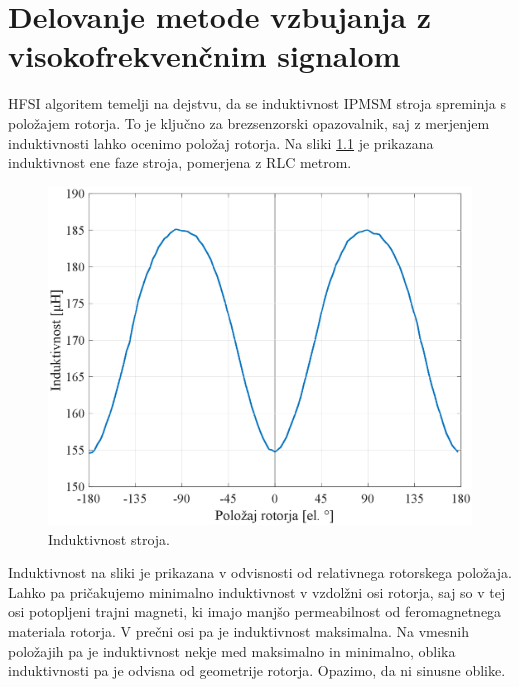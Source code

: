 \documentclass[a4paper,twoside,openright,12pt,slovene]{book}
\begin{document}

\chapter{Delovanje metode vzbujanja z visokofrekvenčnim signalom} \label{teorija}

HFSI algoritem temelji na dejstvu, da se induktivnost IPMSM stroja spreminja s položajem rotorja. To je ključno za brezsenzorski opazovalnik, saj z merjenjem induktivnosti lahko ocenimo položaj
rotorja. Na sliki \ref{induktivnostStroja} je prikazana induktivnost ene faze stroja, pomerjena z RLC metrom.

\begin{figure}[!htbp]
    \centering
    \includegraphics[width=0.99\columnwidth]{Slike/induktivnostStroja.eps}
    \caption{\label{induktivnostStroja} Induktivnost stroja. }
\end{figure}

Induktivnost na sliki je prikazana v odvisnosti od relativnega rotorskega položaja. Lahko pa pričakujemo minimalno induktivnost v vzdolžni osi rotorja, saj so v tej osi potopljeni trajni magneti,
ki imajo manjšo permeabilnost od feromagnetnega materiala rotorja. V prečni osi pa je induktivnost maksimalna. Na vmesnih položajih pa je induktivnost nekje med maksimalno in minimalno,
oblika induktivnosti pa je odvisna od geometrije rotorja. Opazimo, da ni sinusne oblike.
\end{document}
